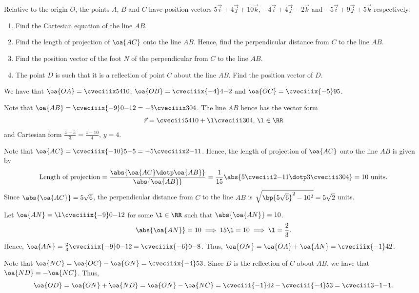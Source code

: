 \begin{problem}
    Relative to the origin $O$, the points $A$, $B$ and $C$ have position vectors $5\vec i + 4\vec j + 10\vec k$, $-4\vec i + 4\vec j - 2\vec k$ and $-5\vec i + 9\vec j + 5\vec k$ respectively.

    \begin{enumerate}
        \item Find the Cartesian equation of the line $AB$.
        \item Find the length of projection of $\oa{AC}$ onto the line $AB$. Hence, find the perpendicular distance from $C$ to the line $AB$.
        \item Find the position vector of the foot $N$ of the perpendicular from $C$ to the line $AB$.
        \item The point $D$ is such that it is a reflection of point $C$ about the line $AB$. Find the position vector of $D$.
    \end{enumerate}
\end{problem}
\begin{solution}
    We have that $\oa{OA} = \cveciiix54{10}$, $\oa{OB} = \cveciiix{-4}4{-2}$ and $\oa{OC} = \cveciiix{-5}95$.

    \begin{ppart}
        Note that $\oa{AB} = \cveciiix{-9}0{-12} = -3\cveciiix304$. The line $AB$ hence has the vector form \[\vec r = \cveciii54{10} + \l\cveciii304, \, \l \in \RR\] and Cartesian form $\frac{x-5}{3} = \frac{z-10}4,\,y=4$.
    \end{ppart}
    \begin{ppart}
        Note that $\oa{AC} = \cveciiix{-10}5{-5} = -5\cveciiix2{-1}1$. Hence, the length of projection of $\oa{AC}$ onto the line $AB$ is given by \[\text{Length of projection} = \frac{\abs{\oa{AC} \dotp \oa{AB}}}{\abs{\oa{AB}}} = \frac1{15} \abs{5\cveciii2{-1}1 \dotp 3\cveciii304} = 10 \text{ units}.\] Since $\abs{\oa{AC}} = 5\sqrt6$, the perpendicular distance from $C$ to the line $AB$ is $\sqrt{\bp{5\sqrt6}^2 - 10^2} = 5\sqrt{2}$ units.
    \end{ppart}
    \begin{ppart}
        Let $\oa{AN} = \l \cveciiix{-9}0{-12}$ for some $\l \in \RR$ such that $\abs{\oa{AN}} = 10$. \[\abs{\oa{AN}} = 10 \implies 15\l = 10 \implies \l = \frac23.\] Hence, $\oa{AN} = \frac23 \cveciiix{-9}0{-12} = \cveciiix{-6}0{-8}$. Thus, $\oa{ON} = \oa{OA} + \oa{AN} = \cveciiix{-1}42$.
    \end{ppart}
    \begin{ppart}
        Note that $\oa{NC} = \oa{OC} - \oa{ON} = \cveciiix{-4}53$. Since $D$ is the reflection of $C$ about $AB$, we have that $\oa{ND} = -\oa{NC}$. Thus, \[\oa{OD} = \oa{ON} + \oa{ND} = \oa{ON} - \oa{NC} = \cveciii{-1}42 - \cveciii{-4}53 = \cveciii3{-1}{-1}.\]
    \end{ppart}
\end{solution}

